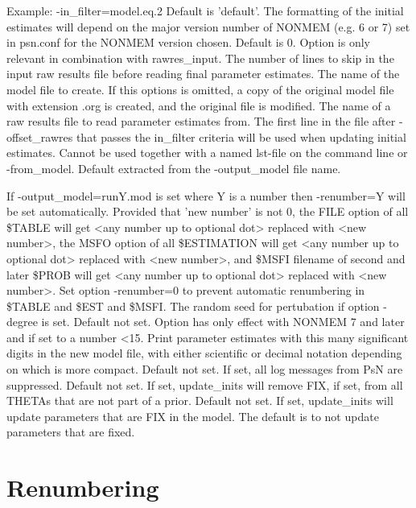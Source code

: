 \begin{optionlist}
Example: -in\_filter=model.eq.2
\nextopt
{}
Default is 'default'. The formatting of the initial estimates will depend on the major version number of NONMEM (e.g. 6 or 7) set in psn.conf for the NONMEM version chosen.
\nextopt
{}
Default is 0. Option is only relevant in combination with rawres\_input. The number of lines to skip in the input raw results file before reading final parameter estimates.
\nextopt
{}
The name of the model file to create. If this options is omitted, a copy of the original model file with extension .org is created, and the original file is modified.
\nextopt
{}
The name of a raw results file to read parameter estimates from. The first line in the file after -offset\_rawres that passes the in\_filter criteria will be used when updating initial estimates. Cannot be used together with a named lst-file on the command line or -from\_model.
\nextopt
{}
Default extracted from the -output\_model file name. 

If -output\_model=runY.mod is set where Y is a number then -renumber=Y will be set automatically. Provided that 'new number' is not 0, the FILE option of all \$TABLE will get <any number up to optional dot> replaced with <new number>, the MSFO option of all \$ESTIMATION will get <any number up to optional dot> replaced with <new number>, and \$MSFI filename of second and later \$PROB will get <any number up to optional dot> replaced with <new number>. Set option -renumber=0 to prevent automatic renumbering in \$TABLE and \$EST and \$MSFI.
\nextopt
{}
The random seed for pertubation if option -degree is set.
\nextopt
{}
Default not set. Option has only effect with NONMEM 7 and later and if set to a number <15. Print parameter estimates with this many significant digits in the new model file, with either scientific or decimal notation depending on which is more compact.
\nextopt
{}
Default not set. If set, all log messages from PsN are suppressed.
\nextopt
{}
Default not set. If set, update\_inits will remove FIX, if set, from all THETAs that are not part of a prior.
\nextopt
{}
Default not set. If set, update\_inits will update parameters that are FIX in the model. The default is to not update parameters that are fixed.
\nextopt
\end{optionlist}

\section{Renumbering}
